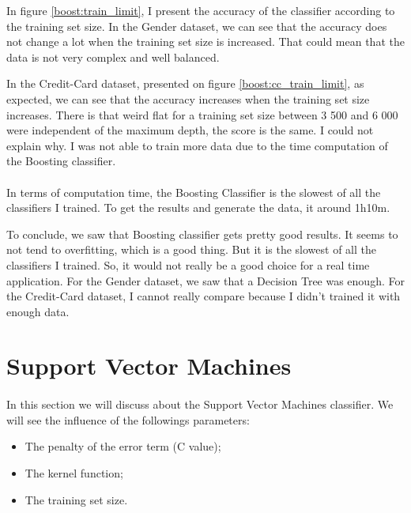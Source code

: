 \documentclass[10pt]{article}
\begin{document}
			In figure \ref{boost:train_limit}, I present the accuracy of the classifier according to the training set size.
			In the Gender dataset, we can see that the accuracy does not change a lot when the training set size is increased. That could mean that the data is not very complex and well balanced.

			In the Credit-Card dataset, presented on figure \ref{boost:cc_train_limit}, as expected, we can see that the accuracy increases when the training set size increases. There is that weird flat for a training set size between 3 500 and 6 000 were independent of the maximum depth, the score is the same. I could not explain why.
			I was not able to train more data due to the time computation of the Boosting classifier.

		\paragraph*{}
			In terms of computation time, the Boosting Classifier is the slowest of all the classifiers I trained. To get the results and generate the data, it around 1h10m.

			To conclude, we saw that Boosting classifier gets pretty good results. It seems to not tend to overfitting, which is a good thing. But it is the slowest of all the classifiers I trained. So, it would not really be a good choice for a real time application. For the Gender dataset, we saw that a Decision Tree was enough. For the Credit-Card dataset, I cannot really compare because I didn't trained it with enough data.
	\section{Support Vector Machines}
		\paragraph*{}
			In this section we will discuss about the Support Vector Machines classifier. We will see the influence of the followings parameters:
			\begin{itemize}
				\item The penalty of the error term (C value);
				\item The kernel function;
				\item The training set size.
			\end{itemize}
\end{document}
